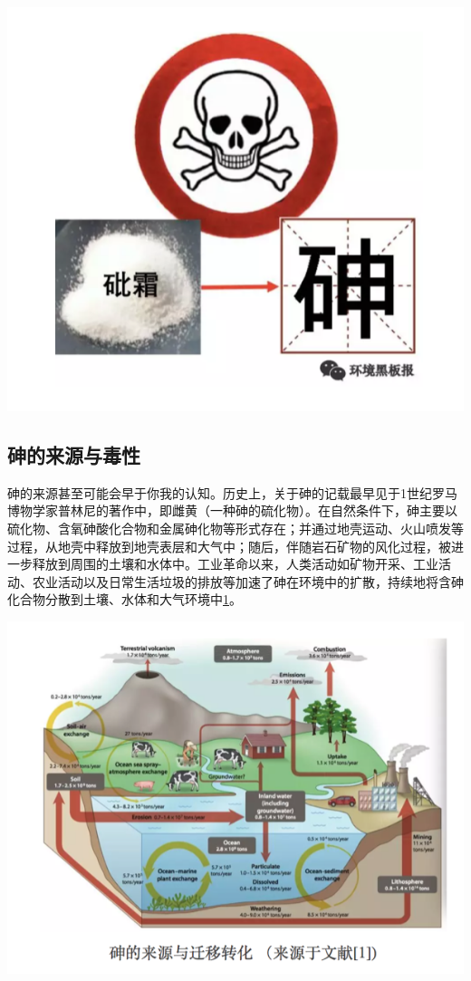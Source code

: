 \documentclass[]{book}
\begin{document}
\includegraphics[width=8.33in]{images/as1}

\subsection{砷的来源与毒性}

砷的来源甚至可能会早于你我的认知。历史上，关于砷的记载最早见于1世纪罗马博物学家普林尼的著作中，即雌黄（一种砷的硫化物）。在自然条件下，砷主要以硫化物、含氧砷酸化合物和金属砷化物等形式存在；并通过地壳运动、火山喷发等过程，从地壳中释放到地壳表层和大气中；随后，伴随岩石矿物的风化过程，被进一步释放到周围的土壤和水体中。工业革命以来，人类活动如矿物开采、工业活动、农业活动以及日常生活垃圾的排放等加速了砷在环境中的扩散，持续地将含砷化合物分散到土壤、水体和大气环境中\href{陈心想，耿增超。西北农林科技大学学报（自然科学版），2013，41:\%20167-174．}{1}。

\includegraphics[width=8.33in]{images/as2}
\end{document}
